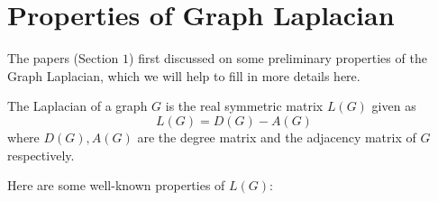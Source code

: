 \documentclass{article}
\begin{document}
\tableofcontents

\newpage

\section{Properties of Graph Laplacian}

The papers (Section $1$) first discussed on some preliminary properties of the Graph Laplacian, which we will help to fill in more details here.

\begin{definition}
    The Laplacian of a graph $G$ is the real symmetric matrix $L(G)$ given as
    \[L(G) = D(G) - A(G)\]
    where $D(G), A(G)$ are the degree matrix and the adjacency matrix of $G$ respectively.
\end{definition}

Here are some well-known properties of $L(G)$:
\end{document}
